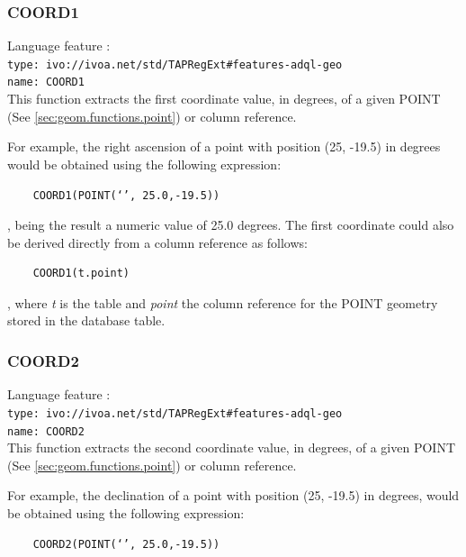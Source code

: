 \documentclass[11pt,a4paper]{ivoa}
\begin{document}
\subsubsection{COORD1}
\label{sec:geom.functions.coord1}
{\footnotesize Language feature :}\\
{\footnotesize \verb|type: ivo://ivoa.net/std/TAPRegExt#features-adql-geo|}\\
{\footnotesize \verb|name: COORD1|}\\

This function extracts the first coordinate value, in degrees, of a given
POINT (See \ref{sec:geom.functions.point}) or column reference.

For example, the right ascension of a point with position (25, -19.5) in
degrees would be obtained using the following expression:

\begin{verbatim}
    COORD1(POINT(‘’, 25.0,-19.5))
\end{verbatim}

, being the result a numeric value of 25.0 degrees. The first coordinate
could also be derived directly from a column reference as follows:

\begin{verbatim}
    COORD1(t.point)
\end{verbatim}
    
, where \textit{t} is the table and \textit{point} the column reference for
the POINT geometry stored in the database table.

\subsubsection{COORD2}
\label{sec:geom.functions.coord2}
{\footnotesize Language feature :}\\
{\footnotesize \verb|type: ivo://ivoa.net/std/TAPRegExt#features-adql-geo|}\\
{\footnotesize \verb|name: COORD2|}\\

This function extracts the second coordinate value, in degrees, of a given
POINT (See \ref{sec:geom.functions.point}) or column reference.

For example, the declination of a point with position (25, -19.5) in degrees,
would be obtained using the following expression:

\begin{verbatim}
    COORD2(POINT(‘’, 25.0,-19.5))
\end{verbatim}
\end{document}
